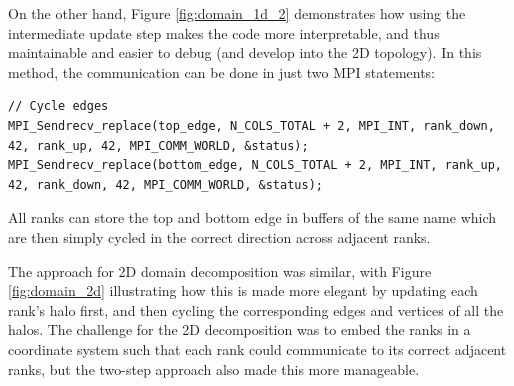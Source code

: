 \documentclass[12pt]{article}
\begin{document}
On the other hand, Figure \ref{fig:domain_1d_2} demonstrates how using the intermediate update step makes the code more interpretable,
and thus maintainable and easier to debug (and develop into the 2D topology).
In this method, the communication can be done in just two MPI statements:

\begin{lstlisting}
// Cycle edges
MPI_Sendrecv_replace(top_edge, N_COLS_TOTAL + 2, MPI_INT, rank_down, 42, rank_up, 42, MPI_COMM_WORLD, &status);
MPI_Sendrecv_replace(bottom_edge, N_COLS_TOTAL + 2, MPI_INT, rank_up, 42, rank_down, 42, MPI_COMM_WORLD, &status);
\end{lstlisting}

All ranks can store the top and bottom edge in buffers of the same name which are then simply cycled in the correct direction across adjacent ranks.

The approach for 2D domain decomposition was similar, with Figure \ref{fig:domain_2d} illustrating how this is made more elegant by updating each rank's halo first,
and then cycling the corresponding edges and vertices of all the halos.
The challenge for the 2D decomposition was to embed the ranks in a coordinate system such that each rank could communicate to its correct adjacent ranks,
but the two-step approach also made this more manageable.
\end{document}
